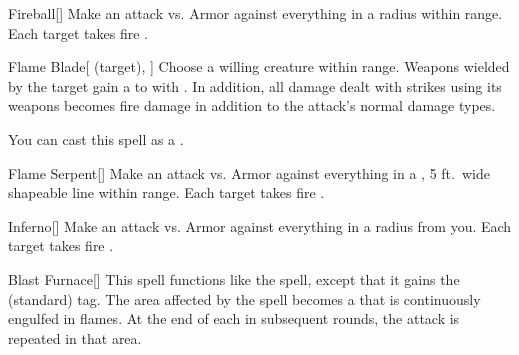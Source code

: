 \lowercase{\hypertarget{spell:Fireball}{}}\label{spell:Fireball}
\begin{freeability}[\nth{2}]{\hypertarget{spell:Fireball}{Fireball}}[]
Make an attack vs. Armor against everything in a \areasmall radius within \rngclose range.
\hit Each target takes fire .
\end{freeability}
\vspace{0.25em}



\lowercase{\hypertarget{spell:Flame Blade}{}}\label{spell:Flame Blade}
\begin{attuneability}[\nth{2}]{\hypertarget{spell:Flame Blade}{Flame Blade}}[ (target), ]
Choose a willing creature within \rngclose range.
Weapons wielded by the target gain a   to  with .
In addition, all damage dealt with strikes using its weapons becomes fire damage in addition to the attack's normal damage types.

You can cast this spell as a .
\end{attuneability}
\vspace{0.25em}



\lowercase{\hypertarget{spell:Flame Serpent}{}}\label{spell:Flame Serpent}
\begin{freeability}[\nth{2}]{\hypertarget{spell:Flame Serpent}{Flame Serpent}}[]
Make an attack vs. Armor against everything in a \areamed, 5 ft.\ wide shapeable line within \rngmed range.
\hit Each target takes fire .
\end{freeability}
\vspace{0.25em}



\lowercase{\hypertarget{spell:Inferno}{}}\label{spell:Inferno}
\begin{freeability}[\nth{2}]{\hypertarget{spell:Inferno}{Inferno}}[]
Make an attack vs. Armor against everything in a \areamed radius from you.
\hit Each target takes fire .
\end{freeability}
\vspace{0.25em}



\lowercase{\hypertarget{spell:Blast Furnace}{}}\label{spell:Blast Furnace}
\begin{freeability}[\nth{3}]{\hypertarget{spell:Blast Furnace}{Blast Furnace}}[]
This spell functions like the  spell, except that it gains the  (standard) tag.
The area affected by the spell becomes a  that is continuously engulfed in flames.
At the end of each  in subsequent rounds, the attack is repeated in that area.
\end{freeability}
\vspace{0.25em}



